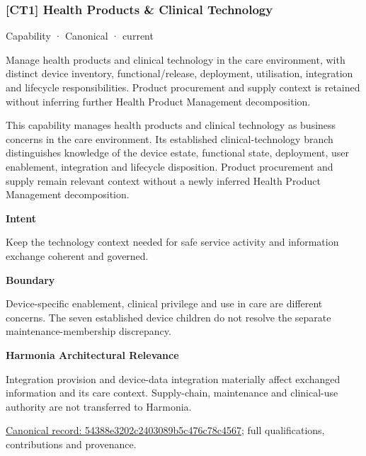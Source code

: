 \subsubsection{[CT1] Health Products \& Clinical Technology}

\label{element:54388e3202c2403089b5c476c78c4567}
{\small Capability · Canonical · current}\par

Manage health products and clinical technology in the care environment, with distinct device inventory, functional/release, deployment, utilisation, integration and lifecycle responsibilities. Product procurement and supply context is retained without inferring further Health Product Management decomposition.



This capability manages health products and clinical technology as business concerns in the care environment. Its established clinical-technology branch distinguishes knowledge of the device estate, functional state, deployment, user enablement, integration and lifecycle disposition. Product procurement and supply remain relevant context without a newly inferred Health Product Management decomposition.



\textbf{Intent}



Keep the technology context needed for safe service activity and information exchange coherent and governed.



\textbf{Boundary}



Device-specific enablement, clinical privilege and use in care are different concerns. The seven established device children do not resolve the separate maintenance-membership discrepancy.



\textbf{Harmonia Architectural Relevance}



Integration provision and device-data integration materially affect exchanged information and its care context. Supply-chain, maintenance and clinical-use authority are not transferred to Harmonia.


{\footnotesize \href{../../../../continuum/strategy/capability/54388e3202c2403089b5c476c78c4567.md}{Canonical record: 54388e3202c2403089b5c476c78c4567}; full qualifications, contributions and provenance.}\par
